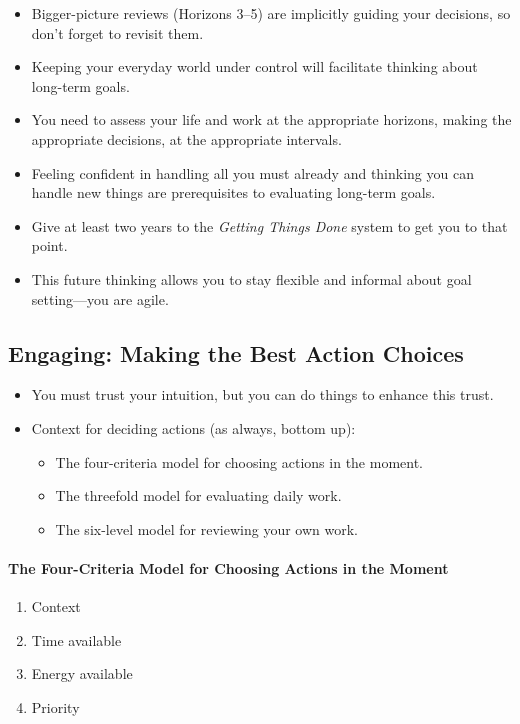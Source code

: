 \documentclass{article}
\begin{document}
\begin{itemize}
  \item Bigger-picture reviews (Horizons 3--5) are implicitly guiding your decisions, so don't forget to revisit them.
  \item Keeping your everyday world under control will facilitate thinking about long-term goals.
  \item You need to assess your life and work at the appropriate horizons, making the appropriate decisions, at the appropriate intervals.
  \item Feeling confident in handling all you must already and thinking you can handle new things are prerequisites to evaluating long-term goals.
  \item Give at least two years to the \textit{Getting Things Done} system to get you to that point.
  \item This future thinking allows you to stay flexible and informal about goal setting---you are agile.
\end{itemize}

\subsection{Engaging: Making the Best Action Choices}

\begin{itemize}
  \item You must trust your intuition, but you can do things to enhance this trust.
  \item Context for deciding actions (as always, bottom up):
  \begin{itemize}
    \item The four-criteria model for choosing actions in the moment.
    \item The threefold model for evaluating daily work.
    \item The six-level model for reviewing your own work.
  \end{itemize}
\end{itemize}

\paragraph{The Four-Criteria Model for Choosing Actions in the Moment}

\begin{enumerate}
  \item Context
  \item Time available
  \item Energy available
  \item Priority
\end{enumerate}
\end{document}
